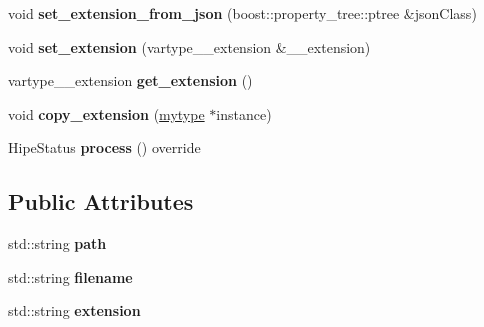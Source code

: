 \begin{DoxyCompactItemize}
\item 
\mbox{\label{classfilter_1_1algos_1_1_save_image_a4fc0ee341e38639b027af620b70d5e1f}} 
void {\bfseries set\+\_\+extension\+\_\+from\+\_\+json} (boost\+::property\+\_\+tree\+::ptree \&json\+Class)
\item 
\mbox{\label{classfilter_1_1algos_1_1_save_image_a51027be585c3df4d1a4eb76d83920d30}} 
void {\bfseries set\+\_\+extension} (vartype\+\_\+\+\_\+extension \&\+\_\+\+\_\+extension)
\item 
\mbox{\label{classfilter_1_1algos_1_1_save_image_a058ef2711770763bddcb67ec1447b782}} 
vartype\+\_\+\+\_\+extension {\bfseries get\+\_\+extension} ()
\item 
\mbox{\label{classfilter_1_1algos_1_1_save_image_a6b5c5e13de6597af15426f3bf24b4fee}} 
void {\bfseries copy\+\_\+extension} (\hyperlink{classfilter_1_1algos_1_1_save_image}{mytype} $\ast$instance)
\item 
\mbox{\label{classfilter_1_1algos_1_1_save_image_a9e998e76d33956ddfbef796489edb982}} 
Hipe\+Status {\bfseries process} () override
\end{DoxyCompactItemize}
\subsection*{Public Attributes}
\begin{DoxyCompactItemize}
\item 
\mbox{\label{classfilter_1_1algos_1_1_save_image_adc1a3f9e18d960cf4fd644e77db75b2e}} 
std\+::string {\bfseries path}
\item 
\mbox{\label{classfilter_1_1algos_1_1_save_image_a87a32e7f6150a439b5786fd7d0a69b0f}} 
std\+::string {\bfseries filename}
\item 
\mbox{\label{classfilter_1_1algos_1_1_save_image_a85ce05b52ff3d1cbf272d569143595cd}} 
std\+::string {\bfseries extension}
\end{DoxyCompactItemize}
